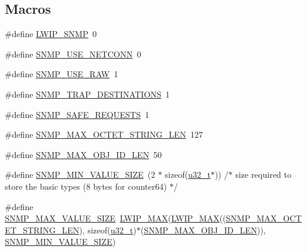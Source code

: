 \subsection*{Macros}
\begin{DoxyCompactItemize}
\item 
\#define \hyperlink{group__snmp__opts_gaf4900859dc53f19f5f67cc34e48ad68c}{L\+W\+I\+P\+\_\+\+S\+N\+MP}~0
\item 
\#define \hyperlink{group__snmp__opts_gaf02e8b4b69e99df784e9953401477078}{S\+N\+M\+P\+\_\+\+U\+S\+E\+\_\+\+N\+E\+T\+C\+O\+NN}~0
\item 
\#define \hyperlink{group__snmp__opts_ga8c93f4260af2eb3c50d4bc603f716f1f}{S\+N\+M\+P\+\_\+\+U\+S\+E\+\_\+\+R\+AW}~1
\item 
\#define \hyperlink{group__snmp__opts_ga692343b0cc555c302fd713003d4f8a08}{S\+N\+M\+P\+\_\+\+T\+R\+A\+P\+\_\+\+D\+E\+S\+T\+I\+N\+A\+T\+I\+O\+NS}~1
\item 
\#define \hyperlink{group__snmp__opts_ga95e39047b9bcb385780b06b35af49261}{S\+N\+M\+P\+\_\+\+S\+A\+F\+E\+\_\+\+R\+E\+Q\+U\+E\+S\+TS}~1
\item 
\#define \hyperlink{group__snmp__opts_gae50cdd09697aa54a8b9f26432ac55ac2}{S\+N\+M\+P\+\_\+\+M\+A\+X\+\_\+\+O\+C\+T\+E\+T\+\_\+\+S\+T\+R\+I\+N\+G\+\_\+\+L\+EN}~127
\item 
\#define \hyperlink{group__snmp__opts_ga3ad9d293f90e3c885c4e3263a9064a41}{S\+N\+M\+P\+\_\+\+M\+A\+X\+\_\+\+O\+B\+J\+\_\+\+I\+D\+\_\+\+L\+EN}~50
\item 
\#define \hyperlink{group__snmp__opts_gac815d0dbe576299546ac612e7eaf3f90}{S\+N\+M\+P\+\_\+\+M\+I\+N\+\_\+\+V\+A\+L\+U\+E\+\_\+\+S\+I\+ZE}~(2 $\ast$ sizeof(\hyperlink{group__compiler__abstraction_ga4c14294869aceba3ef9d4c0c302d0f33}{u32\+\_\+t}$\ast$)) /$\ast$ size required to store the basic types (8 bytes for counter64) $\ast$/
\item 
\#define \hyperlink{group__snmp__opts_gafb4362575bc50476a7401a1ed14787f0}{S\+N\+M\+P\+\_\+\+M\+A\+X\+\_\+\+V\+A\+L\+U\+E\+\_\+\+S\+I\+ZE}~\hyperlink{openmote-cc2538_2lwip_2src_2include_2lwip_2def_8h_a21ea174d374106caeafb4aa3a24fbd2b}{L\+W\+I\+P\+\_\+\+M\+AX}(\hyperlink{openmote-cc2538_2lwip_2src_2include_2lwip_2def_8h_a21ea174d374106caeafb4aa3a24fbd2b}{L\+W\+I\+P\+\_\+\+M\+AX}((\hyperlink{group__snmp__opts_gae50cdd09697aa54a8b9f26432ac55ac2}{S\+N\+M\+P\+\_\+\+M\+A\+X\+\_\+\+O\+C\+T\+E\+T\+\_\+\+S\+T\+R\+I\+N\+G\+\_\+\+L\+EN}), sizeof(\hyperlink{group__compiler__abstraction_ga4c14294869aceba3ef9d4c0c302d0f33}{u32\+\_\+t})$\ast$(\hyperlink{group__snmp__opts_ga3ad9d293f90e3c885c4e3263a9064a41}{S\+N\+M\+P\+\_\+\+M\+A\+X\+\_\+\+O\+B\+J\+\_\+\+I\+D\+\_\+\+L\+EN})), \hyperlink{group__snmp__opts_gac815d0dbe576299546ac612e7eaf3f90}{S\+N\+M\+P\+\_\+\+M\+I\+N\+\_\+\+V\+A\+L\+U\+E\+\_\+\+S\+I\+ZE})

\end{DoxyCompactItemize}
